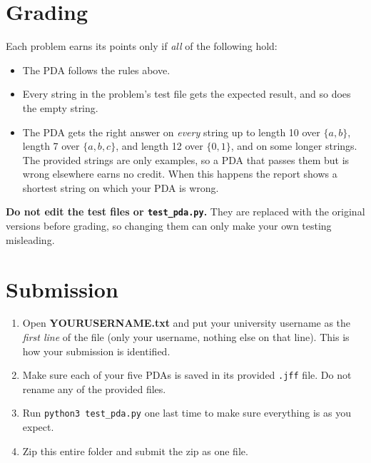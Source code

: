 \documentclass[11pt]{article}
\begin{document}
\section*{Grading}

Each problem earns its points only if \emph{all} of the following hold:
\begin{itemize}
  \item The PDA follows the rules above.
  \item Every string in the problem's test file gets the expected result, and so does the empty
        string.
  \item The PDA gets the right answer on \emph{every} string up to length 10 over $\{a,b\}$,
        length 7 over $\{a,b,c\}$, and length 12 over $\{0,1\}$, and on some longer strings.
        The provided strings are only examples, so a PDA that passes them but is wrong elsewhere
        earns no credit. When this happens the report shows a shortest string on which your PDA
        is wrong.
\end{itemize}

\textbf{Do not edit the test files or \texttt{test\_pda.py}.} They are replaced with the
original versions before grading, so changing them can only make your own testing misleading.

\section*{Submission}

\begin{enumerate}
  \item Open \textbf{YOURUSERNAME.txt} and put your university username as the \emph{first line}
        of the file (only your username, nothing else on that line). This is how your submission
        is identified.
  \item Make sure each of your five PDAs is saved in its provided \texttt{.jff} file. Do not
        rename any of the provided files.
  \item Run \texttt{python3 test\_pda.py} one last time to make sure everything is as you expect.
  \item Zip this entire folder and submit the zip as one file.
\end{enumerate}
\end{document}
